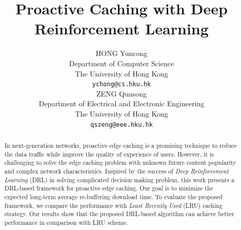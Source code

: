 \documentclass{article}
\title{Proactive Caching with Deep Reinforcement Learning}
\author{
  HONG Yuncong \\
  Department of Computer Science \\
  The University of Hong Kong \\
  \texttt{ychong@cs.hku.hk} \\
  \And %
  ZENG Qunsong \\
  Department of Electrical and Electronic Engineering \\
  The University of Hong Kong \\
  \texttt{qszeng@eee.hku.hk} \\
}
\begin{document}
\maketitle

\begin{abstract}
  In next-generation networks, proactive edge caching is a promising technique to reduce the data traffic while improve the quality of experience of users. However, it is challenging to solve the edge caching problem with unknown future content popularity and complex network characteristics. Inspired by the success of \emph{Deep Reinforcement Learning} (DRL) in solving complicated decision making problem, this work presents a DRL-based framework for proactive edge caching. Our goal is to minimize the expected long-term average re-buffering download time. To evaluate the proposed framework, we compare the performance with \emph{Least Recently Used} (LRU) caching strategy. Our results show that the proposed DRL-based algorithm can achieve better performance in comparison with LRU scheme.
\end{abstract}
\end{document}
